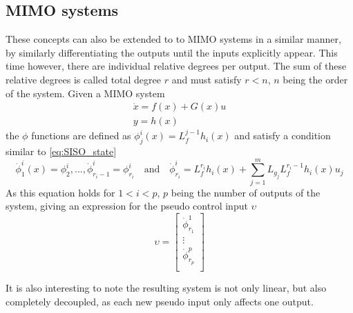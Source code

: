\subsection{MIMO systems}
\label{section:background/MIMO_NLI}

These concepts can also be extended to to MIMO systems in a similar manner, by similarly differentiating the outputs until the inputs explicitly appear. This time however, there are individual relative degrees per output. The sum of these relative degrees is called total degree $r$ and must satisfy $r<n$, $n$ being the order of the system. Given a MIMO system 
\begin{gather}
\dot{x} = f(x) + G(x)u\\
y=h(x)
\end{gather}
the $\phi$ functions are defined as $\phi^i_j(x)=L^{j-1}_fh_i(
x)$ and satisfy a condition similar to \ref{eq:SISO_state} 
\begin{equation}
\dot{\phi}^i_1(x)=\phi^i_2,...,\dot{\phi}^i_{r_i-1}=\phi^i_{r_i} \quad \text{and} \quad \dot{\phi}^i_{r_i}=L_f^{r_i}h_i(x)+\sum^m_{j=1}L_{g_j}L^{r_i-1}_fh_i(x)u_j
\end{equation}
As this equation holds for $1<i<p$, $p$ being the number of outputs of the system, giving an expression for the pseudo control input $\upsilon$
\begin{equation}
\upsilon = 
\begin{bmatrix}
\dot{\phi}^1_{r_1}\\
\vdots\\
\dot{\phi}^p_{r_p}\\
\end{bmatrix}
\end{equation}

It is also interesting to note the resulting system is not only linear, but also completely decoupled, as each new pseudo input only affects one output.


